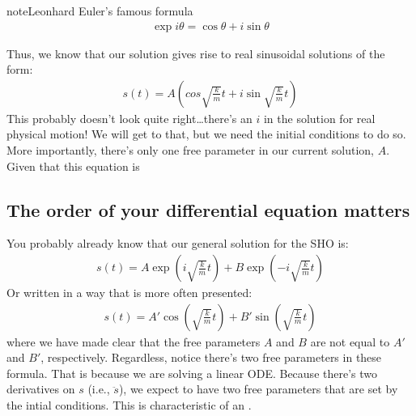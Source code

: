 \documentclass[letterpaper,10pt,english]{jupyterBook}
\begin{document}
\begin{sphinxadmonition}{note}{Leonhard Euler’s famous formula}
\begin{equation*}
\begin{split}\exp{i\theta} = \cos{\theta} + i \sin{\theta}\end{split}
\end{equation*}\end{sphinxadmonition}

\sphinxAtStartPar
Thus, we know that our solution gives rise to real sinusoidal solutions of the form:
\begin{equation*}
\begin{split}s(t) = A\left(cos{\sqrt{\frac{k}{m}} t} + i\sin{\sqrt{\frac{k}{m}} t}\right)\end{split}
\end{equation*}
\sphinxAtStartPar
This probably doesn’t look quite right…there’s an \(i\) in the solution for real physical motion! We will get to that, but we need the initial conditions to do so. More importantly, there’s only one free parameter in our current solution, \(A\). Given that this equation is 


\subsection{The order of your differential equation matters}
\label{\detokenize{content/2_oscillations/readings-oscillators:the-order-of-your-differential-equation-matters}}
\sphinxAtStartPar
You probably already know that our general solution for the SHO is:
\begin{equation*}
\begin{split}s(t) = A\exp(i\sqrt{\frac{k}{m}} t) + B\exp(-i\sqrt{\frac{k}{m}} t)\end{split}
\end{equation*}
\sphinxAtStartPar
Or written in a way that is more often presented:
\begin{equation*}
\begin{split}s(t) = A'\cos(\sqrt{\frac{k}{m}} t) + B'\sin(\sqrt{\frac{k}{m}} t)\end{split}
\end{equation*}
\sphinxAtStartPar
where we have made clear that the free parameters \(A\) and \(B\) are not equal to \(A'\) and \(B'\), respectively. Regardless, notice there’s two free parameters in these formula. That is because we are solving a  linear ODE. Because there’s two derivatives on \(s\) (i.e., \(\ddot{s}\)), we expect to have two free parameters that are set by the intial conditions. This is characteristic of an .
\end{document}
